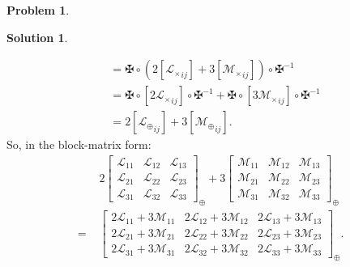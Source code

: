 \documentclass{article}
\theoremstyle{definition}
\newtheorem*{prob*}{Problem}
\newtheorem*{sln*}{Solution}
\newcommand{\lag}{\mathcal{L}}
\newcommand{\M}{\mathcal{M}}
\begin{document}
\begin{prob*}
\begin{sln*}
\begin{enumerate}
\begin{enumerate}
\begin{align*}
				[(2\lag_\oplus + 3\M_\oplus)_{ij}]
				&= \maltese\circ \left( 2[{\lag_\times}_{ij} ] + 3[{\M_\times}_{ij} ]  \right) \circ \maltese^{-1}\\
				&= \maltese\circ [2{\lag_\times}_{ij}]\circ \maltese^{-1} + \maltese\circ [3{\M_\times}_{ij}]\circ \maltese^{-1}\\
				&= 2[{\lag_\oplus}_{ij}] + 3[{\M_\oplus}_{ij}].
				\end{align*}
				So, in the block-matrix form:
				\begin{align*}
				&2\begin{bmatrix}
				\lag_{11} & \lag_{12} & \lag_{13}\\
				\lag_{21} & \lag_{22} & \lag_{23}\\
				\lag_{31} & \lag_{32} & \lag_{33}
				\end{bmatrix}_\oplus
				+ 
				3\begin{bmatrix}
				\M_{11} & \M_{12} & \M_{13}\\
				\M_{21} & \M_{22} & \M_{23}\\
				\M_{31} & \M_{32} & \M_{33}
				\end{bmatrix}_\oplus\\
				=\,\, 
				&\begin{bmatrix}
				2\lag_{11} + 3\M_{11} & 2\lag_{12} + 3\M_{12} & 2\lag_{13} + 3\M_{13}\\
				2\lag_{21} + 3\M_{21} & 2\lag_{22} + 3\M_{22} & 2\lag_{23} + 3\M_{23}\\
				2\lag_{31} + 3\M_{31} & 2\lag_{32} + 3\M_{32} & 2\lag_{33} + 3\M_{33}
				\end{bmatrix}_\oplus.
				\end{align*}
				
				
				
				
				
				
				
				
				
				
				
				
				

\end{enumerate}
\end{enumerate}
\end{sln*}
\end{prob*}
\end{document}
